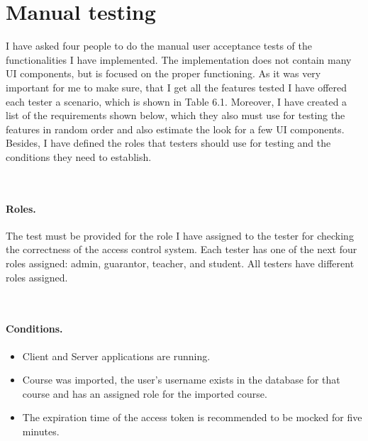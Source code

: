 \section{Manual testing} I have asked four people to do the manual user acceptance tests of the functionalities I have implemented. The implementation does not contain many UI components, but is focused on the proper functioning. As it was very important for me to make sure, that I get all the features tested I have offered each tester a scenario, which is shown in Table 6.1. Moreover, I have created a list of the requirements shown below, which they also must use for testing the features in random order and also estimate the look for a few UI components. Besides, I have defined the roles that testers should use for testing and the conditions they need to establish.  

\

\paragraph*{Roles.} The test must be provided for the role I have assigned to the tester for checking the correctness of the access control system. Each tester has one of the next four roles assigned: admin, guarantor, teacher, and student. All testers have different roles assigned.

\

\paragraph*{Conditions.} 
\begin{itemize}
    \item  Client and Server applications are running.
    \item  Course was imported, the user's username exists in the database for that course and has an assigned role for the imported course.
    \item  The expiration time of the access token is recommended to be mocked for five minutes.
\end{itemize}

\

